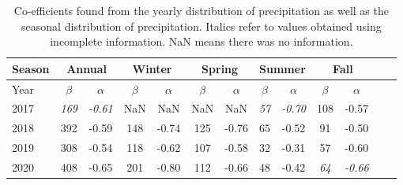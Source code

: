 \begin{table}[htb]
  \begin{center}
    \begin{tabular}{|l|*{11}{c|}r|}
      \hline
      Season    &       \multicolumn{2}{|c|}{Annual}          & \multicolumn{2}{|c|}{Winter}& \multicolumn{2}{|c|}{Spring}  & \multicolumn{2}{|c|}{Summer} &\multicolumn{2}{|c|}{Fall}  \\
      \hline
      Year      & $\beta $ & $\alpha$  & $\beta $ & $\alpha$ & $\beta $ & $\alpha$ & $\beta $ & $\alpha$ & $\beta $ & $\alpha$\\
      \hline
      2017      & \textit{169}  & \textit{-0.61}  & NaN & NaN & NaN & NaN & \textit{57}  & \textit{-0.70}  & 108  & -0.57  \\
      2018      & 392           & -0.59  & 148 & -0.74 & 125 & -0.76 & 65  & -0.52  & 91 & -0.50  \\
      2019      & 308           & -0.54  & 118  & -0.62 & 107 & -0.58 & 32 & -0.31  & 57 &  -0.60 \\
      2020      & 408           & -0.65   & 201  & -0.80 & 112  & -0.66 & 48  & -0.42 & \textit{64} & \textit{-0.66}\\
      \hline
    \end{tabular}
  \end{center}
  \caption[Year comparison of
    coefficients]{\label{firsttable}Co-efficients found from the
    yearly distribution of precipitation as well as the seasonal
    distribution of precipitation. Italics refer to values obtained
    using incomplete information. NaN means there was no
    information. }
\end{table}
